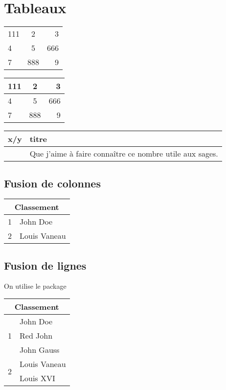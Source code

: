 \documentclass[a4paper, 11pt]{article}
\begin{document}
    \section{Tableaux}

    \begin{tabular}{l || c | r}
        111 & 2 & 3 \\
        4 & 5 & 666 \\
        7 & 888 & 9
    \end{tabular}
    \hspace*{5mm}
    \begin{tabular}{l c r}
        \hline
        111 & 2 & 3 \\
        \hline
        4 & 5 & 666 \\
        \hline\hline
        7 & 888 & 9 \\
        \hline
    \end{tabular}
    \hspace*{5mm}
    \begin{tabular}{| c || p{2cm} |}
        \hline
        x/y & titre \\
        \hline\hline
        {} & Que j'aime à faire connaître ce nombre utile aux sages. \\
        \hline
    \end{tabular}

        \subsection{Fusion de colonnes}

        \begin{tabular}{|c|l|}
        \hline
        \multicolumn{2}{|c|}{Classement} \\
        \hline
        1 & John Doe \\
        2 & Louis Vaneau \\
        \hline
        \end{tabular}

        \subsection{Fusion de lignes}

        On utilise le package 

        \begin{tabular}{|c|l|}
        \hline
        \multicolumn{2}{|c|}{Classement} \\
        \hline
        \multirow{3}{*}{1} & John Doe \\
        & Red John \\
        & John Gauss \\
        \hline
        \multirow{2}{*}{2} & Louis Vaneau \\
        \cline{2-2}
        & Louis XVI \\
        \hline
        \end{tabular}
\end{document}
